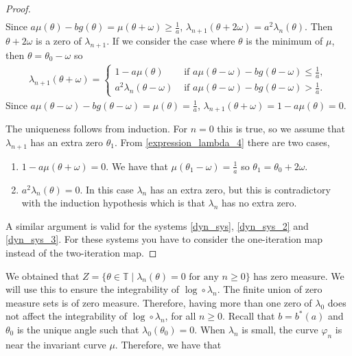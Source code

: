 \documentclass[12pt]{article}
\newcommand{\T}{\mathbb{T}}
\theoremstyle{plain}
\theoremstyle{remark}
\theoremstyle{definition}
\begin{document}
\begin{proof}
\begin{align*}
    \end{align*}
    Since $a\mu(\theta) - b g(\theta) = \mu(\theta+\omega)\geq\frac{1}{a}$, $\lambda_{n+1}(\theta+2\omega)=a^2\lambda_n(\theta)$. Then $\theta+2\omega$ is a zero of $\lambda_{n+1}$. 
    If we consider the case where $\theta$ is the minimum of $\mu$, then $\theta=\theta_0-\omega$ so
    \begin{align*}
        \lambda_{n+1}(\theta+\omega) = 
        \begin{cases}
            1 - a\mu(\theta) &\text{ if }a\mu(\theta-\omega) - b g(\theta-\omega)\leq\frac{1}{a},\\
            a^2\lambda_n(\theta-\omega) &\text{ if }a\mu(\theta-\omega) - b g(\theta-\omega)>\frac{1}{a}.
        \end{cases}
    \end{align*}
    Since $a\mu(\theta-\omega) - b g(\theta-\omega) = \mu(\theta) = \frac{1}{a}$, $\lambda_{n+1}(\theta+\omega) = 1 - a\mu(\theta) = 0$.
    
    The uniqueness follows from induction. For $n=0$ this is true, so we assume that $\lambda_{n+1}$ has an extra zero $\theta_1$. From \eqref{expression_lambda_4} there are two cases,
    \begin{enumerate}
        \item $1 - a\mu(\theta+\omega)=0$.
        We have that $\mu(\theta_1-\omega)=\frac{1}{a}$ so $\theta_1=\theta_0+2\omega$.
        
        \item $a^2\lambda_n(\theta)=0$.
        In this case $\lambda_n$ has an extra zero, but this is contradictory with the induction hypothesis which is that $\lambda_{n}$ has no extra zero.
    \end{enumerate}
    A similar argument is valid for the systems \eqref{dyn_sys}, \eqref{dyn_sys_2} and \eqref{dyn_sys_3}. For these systems you have to consider the one-iteration map instead of the two-iteration map.
\end{proof}
We obtained that $Z=\{\theta\in\T\mid\lambda_n(\theta)=0\text{ for any }n\geq0\}$ has zero measure. We will use this to ensure the integrability of $\log\circ\lambda_n$. The finite union of zero measure sets is of zero measure. Therefore, having more than one zero of $\lambda_0$ does not affect the integrability of $\log\circ\lambda_n$, for all $n\geq0$.
Recall that $b=b^*(a)$ and $\theta_0$ is the unique angle such that $\lambda_0(\theta_0)=0$. When $\lambda_n$ is small, the curve $\varphi_n$ is near the invariant curve $\mu$. Therefore, we have that
\end{document}
